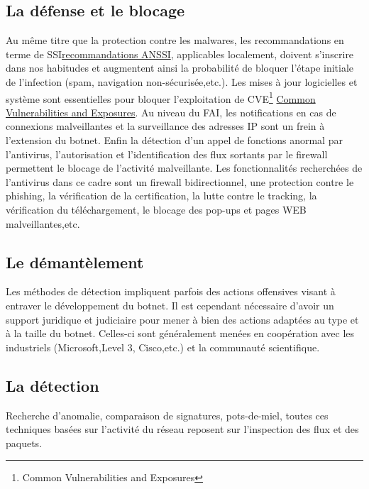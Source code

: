 \subsection{La défense et le blocage}
Au même titre que la protection contre les malwares, les recommandations en terme de SSI\href{https://www.ssi.gouv.fr/administration/bonnes-pratiques/}{recommandations ANSSI}, applicables localement, doivent s'inscrire dans nos habitudes et augmentent ainsi la probabilité de bloquer l'étape initiale de l'infection (spam, navigation non-sécurisée,etc.).
\newline Les mises à jour logicielles et système sont essentielles pour bloquer l'exploitation de CVE\footnote{Common Vulnerabilities and Exposures} \href{https://www.cvedetails.com}{Common Vulnerabilities and Exposures}.
\newline Au niveau du FAI, les notifications en cas de connexions malveillantes et la surveillance des adresses IP sont un frein à l'extension du botnet.
\newline Enfin la détection d'un appel de fonctions anormal par l'antivirus, l'autorisation et l’identification des flux sortants par le firewall permettent le blocage de l'activité malveillante.
Les fonctionnalités recherchées de l'antivirus dans ce cadre sont un firewall bidirectionnel, une protection contre le phishing, la vérification de la certification, la lutte contre le tracking, la vérification du téléchargement, le blocage des pop-ups et pages WEB malveillantes,etc. 

\subsection{Le démantèlement}
Les méthodes de détection impliquent parfois des actions offensives visant à entraver le développement du botnet.
Il est cependant nécessaire d'avoir un support juridique et judiciaire pour mener à bien des actions adaptées au type et à la taille du botnet.
Celles-ci sont généralement menées en coopération avec les industriels (Microsoft,Level 3, Cisco,etc.) et la communauté scientifique.


\subsection{La détection}
Recherche d'anomalie, comparaison de signatures, pots-de-miel, toutes ces techniques basées sur l'activité du réseau reposent sur l'inspection des flux et des paquets.

